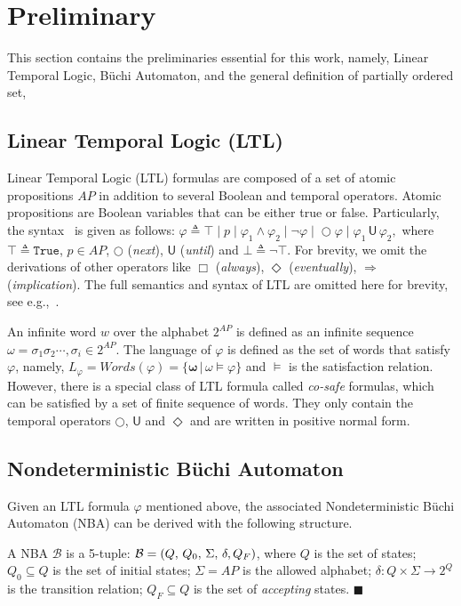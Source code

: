 \section{Preliminary}\label{sec:preliminary}
This section contains the preliminaries essential for this work,
namely, Linear Temporal Logic, B\"uchi Automaton,
and the general definition of partially ordered set,
\subsection{Linear Temporal Logic (LTL)}\label{subsec:LTL}
Linear Temporal Logic (LTL) formulas are composed of a set of atomic propositions $AP$
in addition to several Boolean and temporal operators. Atomic propositions are Boolean variables that can
be either true or false.  Particularly, the syntax~\cite{baier2008principles} is given as follows:
$\varphi \triangleq \top \;|\; p  \;|\; \varphi_1 \wedge \varphi_2  \;|\; \neg \varphi  \;|\; \bigcirc \varphi  \;|\;  \varphi_1 \,\textsf{U}\, \varphi_2,$
where $\top\triangleq \texttt{True}$, $p \in AP$, $\bigcirc$ (\emph{next}),
$\textsf{U}$ (\emph{until}) and $\bot\triangleq \neg \top$.
For brevity, we omit the derivations of other operators like $\Box$ (\emph{always}),
 $\Diamond$ (\emph{eventually}), $\Rightarrow$ (\emph{implication}).
The full semantics and syntax of LTL are omitted here for brevity,
see e.g.,~\cite{baier2008principles}.

An infinite {word} $w$ over the alphabet $2^{AP}$ is defined as an
infinite sequence ${\omega}=\sigma_1\sigma_2\cdots, \sigma_i\in 2^{AP}$.
The language of $\varphi$ is defined as the set of words that satisfy $\varphi$,
namely, $L_\varphi=Words(\varphi)=\{\boldsymbol{\omega}\,|\,\omega\models\varphi\}$
and $\models$ is the satisfaction relation.
However, there is a special class of LTL formula called \emph{co-safe} formulas,
which can be satisfied by a set of finite sequence of words.
They only contain the temporal operators $\bigcirc$, $\textsf{U}$ and $\Diamond$
 and are written in positive normal form.

\subsection{Nondeterministic B\"uchi Automaton}\label{subsec:nba}

Given an LTL formula $\varphi$ mentioned above, the associated Nondeterministic B\"{u}chi Automaton (NBA) can be derived with the following structure.
\begin{definition}[NBA] \label{def:nba}
A NBA $\mathcal{B}$ is a 5-tuple: $\mathcal{B}=(Q,\,Q_0,\,\Sigma,\,\delta,\,\\Q_F)$,
where $Q$ is the set of states;
$Q_0\subseteq Q$ is the set of initial states;
$\Sigma=AP$ is the allowed alphabet;
$\delta:Q\times \Sigma\rightarrow2^{Q}$ is the transition relation;
$Q_F\subseteq Q$ is the set of \emph{accepting} states. \hfill $\blacksquare$
\end{definition}

